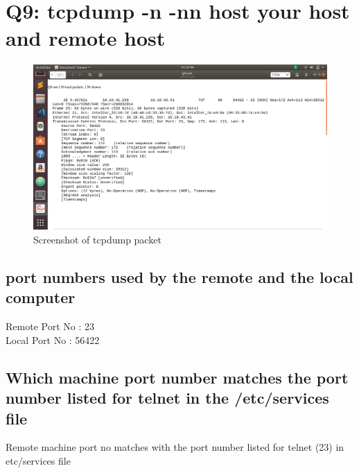 \documentclass{article}
\begin{document}
\section{Q9: tcpdump -n -nn host your host and remote host}
\begin{figure}[H]
 \centering
 \includegraphics[width=1.0\textwidth]{../Q9/ports.png}
 \caption{\label{fig:PORTS}Screenshot of tcpdump packet}
 \end{figure}
\subsection{port numbers used by the remote and the local computer}
Remote Port No : 23 \\
Local Port No : 56422
\subsection{Which machine  port number matches the port number listed for telnet in the /etc/services file}
Remote machine port no matches with the port number listed for telnet (23) in etc/services file
\end{document}
